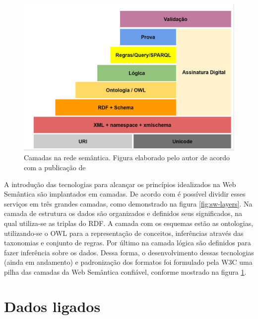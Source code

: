 \begin{figure}
	\centering
	\includegraphics[scale=0.30]{imagens/sw_w3c_stack.jpg}
	\caption{Camadas na rede semântica. Figura elaborado pelo autor de acordo com a publicação de \cite{SemanticWebStack}}
	\label{fig:sw-w3c-stack}
\end{figure}

A introdução das tecnologias para alcançar os princípios idealizados na Web Semântica são implantados em camadas. De acordo com \cite{bernerslee2001semantic} é possível dividir esses serviços em três grandes camadas, como demonstrado na figura \ref{fig:sw-layers}. Na camada de estrutura os dados são organizados e definidos seus significados, na qual utiliza-se as triplas do RDF. A camada com os esquemas estão as ontologias, utilizando-se o OWL para a representação de conceitos, inferências através das taxonomias e conjunto de regras. Por último na camada lógica são definidos para fazer inferência sobre os dados. Dessa forma, o desenvolvimento dessas tecnologias (ainda em andamento) e padronização dos formatos foi formulado pela W3C uma pilha das camadas \citep{SemanticWebStack} da Web Semântica confiável, conforme mostrado na figura \ref{fig:sw-w3c-stack}.

\section{Dados ligados}

